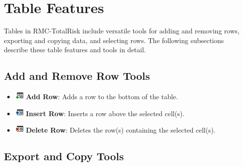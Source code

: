 \documentclass[
]{book}
\begin{document}
\hypertarget{table-features}{%
\section{Table Features}\label{table-features}}

Tables in RMC-TotalRisk include versatile tools for adding and removing rows, exporting and copying data, and selecting rows. The following subsections describe these table features and tools in detail.

\hypertarget{add-and-remove-row-tools}{%
\subsection{Add and Remove Row Tools}\label{add-and-remove-row-tools}}

\begin{itemize}
\item
  \includegraphics{images/addrow.png} \textbf{Add Row}: Adds a row to the bottom of the table.
\item
  \includegraphics{images/insertrow.png} \textbf{Insert Row}: Inserts a row above the selected cell(s).
\item
  \includegraphics{images/deleterow.png} \textbf{Delete Row}: Deletes the row(s) containing the selected cell(s).
\end{itemize}

\hypertarget{export-and-copy-tools}{%
\subsection{Export and Copy Tools}\label{export-and-copy-tools}}
\end{document}
